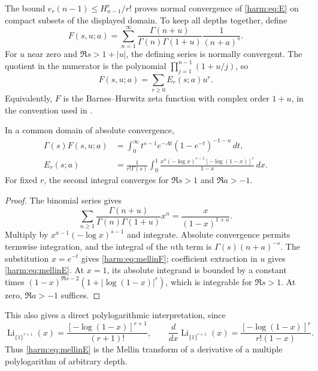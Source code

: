 The bound $e_r(n-1)\leq H_{n-1}^r/r!$ proves normal convergence of
\eqref{harm:eq:E} on compact subsets of the displayed domain.  To keep
all depths together, define
\begin{equation}\label{harm:eq:F}
 F(s,u;a)=\sum_{n=1}^{\infty}
 \frac{\Gamma(n+u)}{\Gamma(n)\Gamma(1+u)}\frac1{(n+a)^s}.
\end{equation}
For $u$ near zero and $\Re s>1+|u|$, the defining series is normally
convergent.  The quotient in the numerator is the polynomial
$\prod_{j=1}^{n-1}(1+u/j)$, so
\begin{equation}\label{harm:eq:coeff}
 F(s,u;a)=\sum_{r\geq0}E_r(s;a)u^r.
\end{equation}
Equivalently, $F$ is the Barnes--Hurwitz zeta function with complex
order $1+u$, in the convention used in \cite{Young2024}.

\begin{proposition}\label{harm:prop:mellin}
In a common domain of absolute convergence,
\begin{align}
 \Gamma(s)F(s,u;a)
 &=\int_0^{\infty}t^{s-1}e^{-At}
                  (1-e^{-t})^{-1-u}\,dt,\label{harm:eq:mellinF}\\
 E_r(s;a)
 &=\frac1{r!\Gamma(s)}\int_0^1
       \frac{x^a(-\log x)^{s-1}[-\log(1-x)]^r}{1-x}\,dx.
       \label{harm:eq:mellinE}
\end{align}
For fixed $r$, the second integral converges for $\Re s>1$ and
$\Re a>-1$.
\end{proposition}
\begin{proof}
The binomial series gives
\[
 \sum_{n\geq1}\frac{\Gamma(n+u)}{\Gamma(n)\Gamma(1+u)}x^n
       =\frac{x}{(1-x)^{1+u}}.
\]
Multiply by $x^{a-1}(-\log x)^{s-1}$ and integrate.  Absolute
convergence permits termwise integration, and the integral of the
$n$th term is $\Gamma(s)(n+a)^{-s}$.  The substitution $x=e^{-t}$
gives \eqref{harm:eq:mellinF}; coefficient extraction in $u$ gives
\eqref{harm:eq:mellinE}.  At $x=1$, its absolute integrand is bounded
by a constant times
$(1-x)^{\Re s-2}(1+|\log(1-x)|^r)$, which is integrable for
$\Re s>1$.  At zero, $\Re a>-1$ suffices.
\end{proof}

This also gives a direct polylogarithmic interpretation, since
\[
 \operatorname{Li}_{\{1\}^{r+1}}(x)
 =\frac{[-\log(1-x)]^{r+1}}{(r+1)!},\qquad
 \frac{d}{dx}\operatorname{Li}_{\{1\}^{r+1}}(x)
 =\frac{[-\log(1-x)]^r}{r!(1-x)}.
\]
Thus \eqref{harm:eq:mellinE} is the Mellin transform of a derivative
of a multiple polylogarithm of arbitrary depth.

